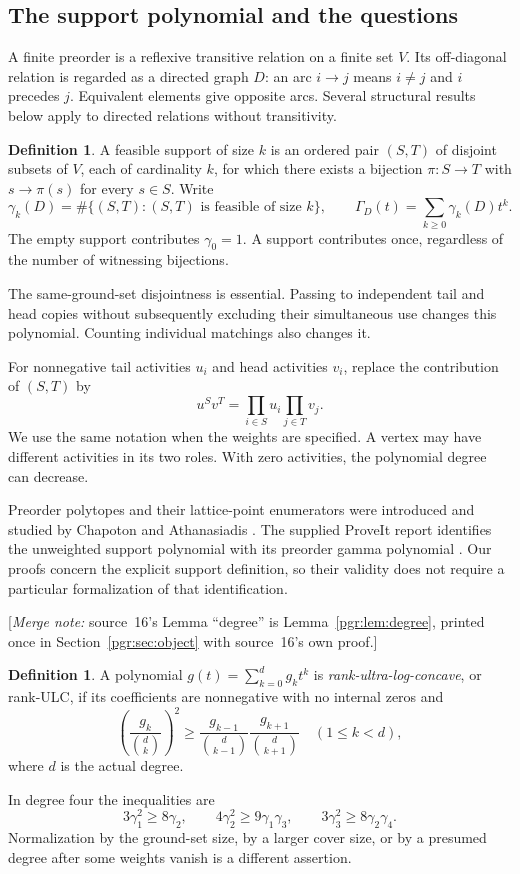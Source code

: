 \documentclass[11pt]{article}
\numberwithin{equation}{section}
\theoremstyle{definition}\newtheorem{definition}[theorem]{Definition}\newtheorem{remark}[theorem]{Remark}
\newcommand{\Ga}{\Gamma}                   %
\newcommand{\mnote}[1]{[\textit{Merge note:} #1]}
\begin{document}
\subsection{The support polynomial and the questions}
A finite preorder is a reflexive transitive relation on a finite set $V$. Its off-diagonal relation is regarded as a directed graph $D$: an arc $i\to j$ means $i\ne j$ and $i$ precedes $j$. Equivalent elements give opposite arcs. Several structural results below apply to directed relations without transitivity.

\begin{definition}
A feasible support of size $k$ is an ordered pair $(S,T)$ of disjoint subsets of $V$, each of cardinality $k$, for which there exists a bijection $\pi:S\to T$ with $s\to\pi(s)$ for every $s\in S$. Write
\[
 \gamma_k(D)=\#\{(S,T): (S,T)\text{ is feasible of size }k\},\qquad
 \Ga_D(t)=\sum_{k\ge0}\gamma_k(D)t^k.
\]
The empty support contributes $\gamma_0=1$. A support contributes once, regardless of the number of witnessing bijections.
\end{definition}
The same-ground-set disjointness is essential. Passing to independent tail and head copies without subsequently excluding their simultaneous use changes this polynomial. Counting individual matchings also changes it.

For nonnegative tail activities $u_i$ and head activities $v_i$, replace the contribution of $(S,T)$ by
\[
 u^S v^T=\prod_{i\in S}u_i\prod_{j\in T}v_j.
\]
We use the same notation when the weights are specified. A vertex may have different activities in its two roles. With zero activities, the polynomial degree can decrease.

Preorder polytopes and their lattice-point enumerators were introduced and studied by Chapoton and Athanasiadis \cite{AC}. The supplied ProveIt report identifies the unweighted support polynomial with its preorder gamma polynomial \cite{PRP}. Our proofs concern the explicit support definition, so their validity does not require a particular formalization of that identification.


\mnote{source~16's Lemma ``degree'' is Lemma~\ref{pgr:lem:degree}, printed
once in Section~\ref{pgr:sec:object} with source~16's own proof.}


\begin{definition}
A polynomial $g(t)=\sum_{k=0}^d g_k t^k$ is \emph{rank-ultra-log-concave}, or rank-ULC, if its coefficients are nonnegative with no internal zeros and
\[
 \left(\frac{g_k}{\binom dk}\right)^2\ge
 \frac{g_{k-1}}{\binom d{k-1}}\frac{g_{k+1}}{\binom d{k+1}}
 \quad(1\le k<d),
\]
where $d$ is the actual degree.
\end{definition}
In degree four the inequalities are
\begin{equation}\label{pgr:u:d4:eq:gaps}
 3\gamma_1^2\ge8\gamma_2,\qquad
 4\gamma_2^2\ge9\gamma_1\gamma_3,\qquad
 3\gamma_3^2\ge8\gamma_2\gamma_4.
\end{equation}
Normalization by the ground-set size, by a larger cover size, or by a presumed degree after some weights vanish is a different assertion.
\end{document}
